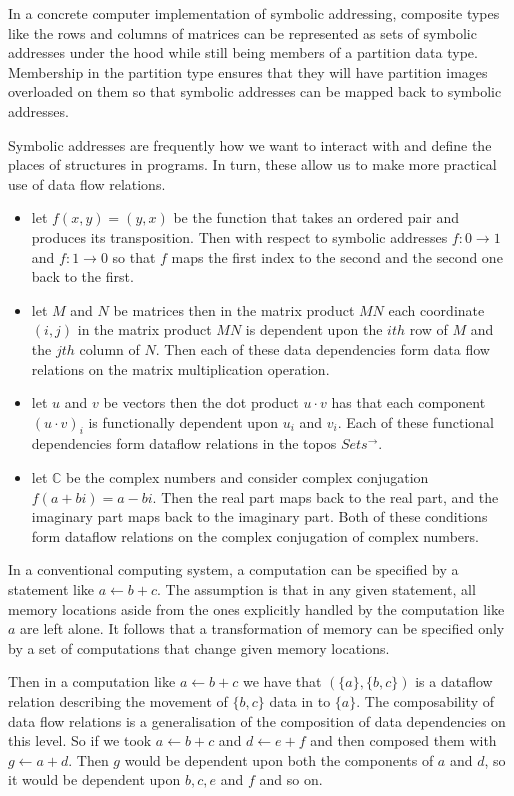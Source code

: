 \documentclass[a4paper,11pt, notitlepage]{report}
\theoremstyle{definition}
\begin{document}
In a concrete computer implementation of symbolic addressing, composite types like the rows and columns of matrices can be represented as sets of symbolic addresses under the hood while still being members of a partition data type. Membership in the partition type ensures that they will have partition images overloaded on them so that symbolic addresses can be mapped back to symbolic addresses.

Symbolic addresses are frequently how we want to interact with and define the places of structures in programs. In turn, these allow us to make more practical use of data flow relations.

\begin{itemize}
 \item let $f(x,y) = (y,x)$ be the function that takes an ordered pair and produces its transposition. Then with respect to symbolic addresses $f : 0 \to 1$ and $f : 1 \to 0$ so that $f$ maps the first index to the second and the second one back to the first.
 \item let $M$ and $N$ be matrices then in the matrix product $MN$ each coordinate $(i,j)$ in the matrix product $MN$ is dependent upon the $ith$ row of $M$ and the $jth$ column of $N$. Then each of these data dependencies form data flow relations on the matrix multiplication operation.
 \item let $u$ and $v$ be vectors then the dot product $u \cdot v$ has that each component $(u \cdot v)_i$ is functionally dependent upon $u_i$ and $v_i$. Each of these functional dependencies form dataflow relations in the topos $Sets^{\to}$.
 \item  let $\mathbb{C}$ be the complex numbers and consider complex conjugation $f(a+bi) = a-bi$. Then the real part maps back to the real part, and the imaginary part maps back to the imaginary part. Both of these conditions form dataflow relations on the complex conjugation of complex numbers.
\end{itemize}

In a conventional computing system, a computation can be specified by a statement like $a \leftarrow b + c$. The assumption is that in any given statement, all memory locations aside from the ones explicitly handled by the computation like $a$ are left alone. It follows that a transformation of memory can be specified only by a set of computations that change given memory locations.

Then in a computation like $a \leftarrow b + c$ we have that $(\{a\},\{b,c\})$ is a dataflow relation describing the movement of $\{b,c\}$ data in to $\{a\}$. The composability of data flow relations is a generalisation of the composition of data dependencies on this level. So if we took $a \leftarrow b+c$ and $d \leftarrow e+f$ and then composed them with $g \leftarrow a+d$. Then $g$ would be dependent upon both the components of $a$ and $d$, so it would be dependent upon $b,c,e$ and $f$ and so on.
\end{document}
